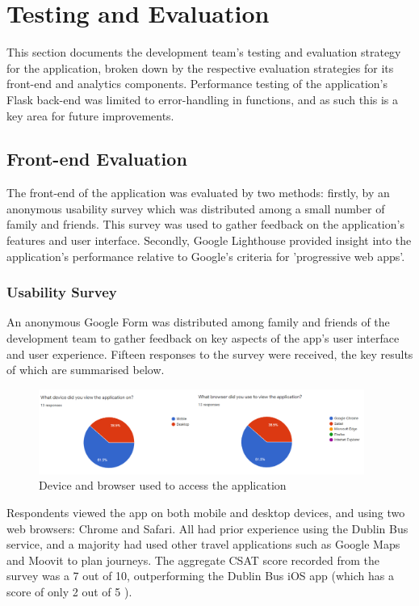 \documentclass[]{UCD_CS_47360_Report}
\begin{document}
\chapter{\label{chapter5}Testing and Evaluation}
This section documents the development team’s testing and evaluation strategy for the application, broken down by the respective evaluation strategies for its front-end and analytics components. Performance testing of the application’s Flask back-end was limited to error-handling in functions, and as such this is a key area for future improvements.

\section{Front-end Evaluation}
The front-end of the application was evaluated by two methods: firstly, by an anonymous usability survey which was distributed among a small number of family and friends. This survey was used to gather feedback on the application’s features and user interface.
Secondly, Google Lighthouse provided insight into the application’s performance relative to Google's criteria for 'progressive web apps'.

\subsection{Usability Survey}
An anonymous Google Form was distributed among family and friends of the development team to gather feedback on key aspects of the app’s user interface and user experience.
Fifteen responses to the survey were received, the key results of which are summarised below.

\begin{figure}[!htb]
    \centering
    \includegraphics[width=0.95\textwidth]{figures/survey_results_device_browser.png}
    \caption{Device and browser used to access the application}
    \label{fig:SurveyResults}
\end{figure}

Respondents viewed the app on both mobile and desktop devices, and using two web browsers: Chrome and Safari. All had prior experience using the Dublin Bus service, and a majority had used other travel applications such as Google Maps and Moovit to plan journeys. The aggregate CSAT score \cite{CSAT} recorded from the survey was a 7 out of 10, outperforming the Dublin Bus iOS app (which has a score of only 2 out of 5 \cite{DublinBus-Reviews}).
\end{document}
